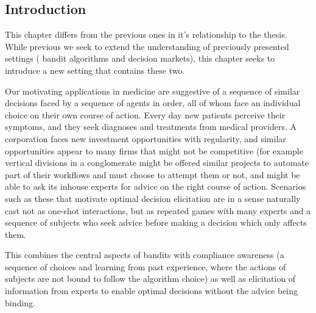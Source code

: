 
\subsection{Introduction}

This chapter differs from the previous ones in it's relationship to the thesis. 
While previous we seek to extend the understanding of previously presented settings ( bandit algorithms and decision markets), this chapter seeks to introduce a new setting that contains these two.



Our motivating applications in medicine are suggestive of a sequence of similar decisions faced by a sequence of agents in order, all of whom face an individual choice on their own course of action.
Every day new patients perceive their symptoms, and they seek diagnoses and treatments from medical providers. 
A corporation faces new investment opportunities with regularity, and similar opportunities appear to many firms that might not be competitive (for example vertical divisions in a conglomerate might be offered similar projects to automate part of their workflows and must choose to attempt them or not, and might be able to ask its inhouse experts for advice on the right course of action.
Scenarios such as these that motivate optimal decision elicitation are in a sense naturally cast not as one-shot interactions, but as repeated games with many experts and a sequence of subjects who seek advice before making a decision which only affects them.

This combines the central aspects of bandits with compliance awareness (a sequence of choices and learning from past experience, where the actions of subjects are not bound to follow the algorithm choice) as well as elicitation of information from experts to enable optimal decisions without the advice being binding. 



